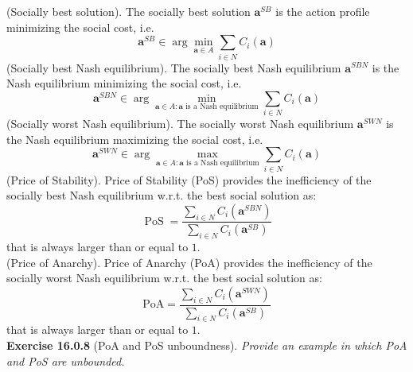 (Socially best solution). The socially best solution $\mathbf{a}^{SB}$ is the action profile minimizing the social cost, i.e.
$$
\mathbf{a}^{S B} \in \arg \min _{\mathbf{a} \in A} \sum_{i \in N} C_{i}(\mathbf{a})
$$
(Socially best Nash equilibrium). The socially best Nash equilibrium $\mathbf{a}^{SBN}$ is the Nash equilibrium minimizing the social cost, i.e.
$$
\mathbf{a}^{S B N} \in \arg \min _{\mathbf{a} \in A: \mathbf{a} \text { is a Nash equilibrium}} \sum_{i \in N} C_{i}(\mathbf{a})
$$
(Socially worst Nash equilibrium). The socially worst Nash equilibrium $\mathbf{a}^{SWN}$ is the Nash equilibrium maximizing the social cost, i.e.
$$
\mathbf{a}^{S W N} \in \arg \max _{\mathbf{a} \in A: \mathbf{a} \text { is a Nash equilibrium}} \sum_{i \in N} C_{i}(\mathbf{a})
$$
(Price of Stability). Price of Stability (PoS) provides the inefficiency of the socially best Nash equilibrium w.r.t. the best social solution as:
$$
\operatorname{PoS}=\frac{\sum_{i \in N} C_{i}\left(\mathbf{a}^{S B N}\right)}{\sum_{i \in N} C_{i}\left(\mathbf{a}^{S B}\right)}
$$
that is always larger than or equal to $1$.\\
(Price of Anarchy). Price of Anarchy (PoA) provides the inefficiency of the socially worst Nash equilibrium w.r.t. the best social solution as:
$$
\mathrm{PoA}=\frac{\sum_{i \in N} C_{i}\left(\mathbf{a}^{S W N}\right)}{\sum_{i \in N} C_{i}\left(\mathbf{a}^{S B}\right)}
$$
that is always larger than or equal to $1$.\\

\textbf{Exercise 16.0.8} (PoA and PoS unboundness). \textit{Provide an example in which PoA and PoS are unbounded.}\\


